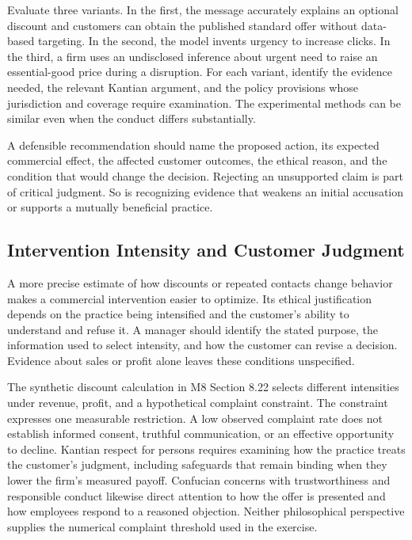 Evaluate three variants. In the first, the message accurately explains
an optional discount and customers can obtain the published standard
offer without data-based targeting. In the second, the model invents
urgency to increase clicks. In the third, a firm uses an undisclosed
inference about urgent need to raise an essential-good price during a
disruption. For each variant, identify the evidence needed, the relevant
Kantian argument, and the policy provisions whose jurisdiction and
coverage require examination. The experimental methods can be similar
even when the conduct differs substantially.

A defensible recommendation should name the proposed action, its
expected commercial effect, the affected customer outcomes, the ethical
reason, and the condition that would change the decision. Rejecting an
unsupported claim is part of critical judgment. So is recognizing
evidence that weakens an initial accusation or supports a mutually
beneficial practice.

\hypertarget{M09-intervention-intensity-and-customer-judgment}{%
\subsection{Intervention Intensity and Customer
Judgment}\label{M09-intervention-intensity-and-customer-judgment}}

\noindent \noindent A more precise estimate of how discounts or repeated contacts
change behavior makes a commercial intervention easier to optimize. Its
ethical justification depends on the practice being intensified and the
customer's ability to understand and refuse it. A manager should
identify the stated purpose, the information used to select intensity,
and how the customer can revise a decision. Evidence about sales or
profit alone leaves these conditions unspecified.

The synthetic discount calculation in M8 Section 8.22 selects different
intensities under revenue, profit, and a hypothetical complaint
constraint. The constraint expresses one measurable restriction. A low
observed complaint rate does not establish informed consent, truthful
communication, or an effective opportunity to decline. Kantian respect
for persons requires examining how the practice treats the customer's
judgment, including safeguards that remain binding when they lower the
firm's measured payoff. Confucian concerns with trustworthiness and
responsible conduct likewise direct attention to how the offer is
presented and how employees respond to a reasoned objection. Neither
philosophical perspective supplies the numerical complaint threshold
used in the exercise.

